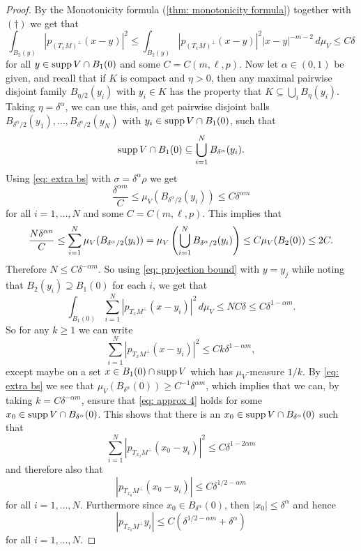 \begin{proof}
By the Monotonicity formula (\cref{thm: monotonicity formula}) together with $(\dagger)$ we get that
\begin{equation}
    \int_{B_2(y)} | p_{(T_xM)^{\perp}} (x - y) |^2 \le \int_{B_2(y)} |p_{(T_xM)^{\perp}} (x - y)|^2 |x-y|^{-m-2}\, d\mu_V \le C\delta \label{eq: projection bound}
\end{equation}
for all $y \in \operatorname{supp} V \cap B_1(0)$ and some $C=C(m,\ell,p)$. Now let $\alpha \in (0,1)$ be given, and recall that if $K$ is compact and $\eta > 0$, then any maximal pairwise disjoint family $B_{\eta/2}(y_i)$ with $y_i \in K$ has the property that $K \subseteq \bigcup_i B_{\eta}(y_i)$. Taking $\eta = \delta^{\alpha}$, we can use this, and get pairwise disjoint balls $B_{\delta^{\alpha}/2}(y_1), \dots, B_{\delta^{\alpha}/2}(y_N)$ with $y_i \in \operatorname{supp} V \cap B_1(0)$, such that
\begin{equation}
    \operatorname{supp} V \cap B_1(0) \subseteq \bigcup_{i=1}^N B_{\delta^{\alpha}}(y_i).\label{eq: helpful subsets}
\end{equation}
Using \eqref{eq: extra bs} with $\sigma = \delta^{\alpha}\rho$ we get
\[
    \frac{\delta^{\alpha m}}{C} \le \mu_V(B_{\delta^{\alpha}/2}(y_i)) \le C \delta^{\alpha m}
\]
for all $i = 1, \dots, N$ and some $C=C(m, \ell, p)$. This implies that
\[
    \frac{N \delta^{\alpha n}}{C} \le \sum_{i=1}^N \mu_V(B_{\delta^{\alpha}/2} (y_i)) = \mu_V\left( \bigcup_{i=1}^N B_{\delta^{\alpha}/2 } (y_i)\right) \le C \mu_V(B_2(0)) \le 2C.
\]
Therefore $N \le C \delta^{-\alpha m}$. So using \eqref{eq: projection bound} with $y=y_j$ while noting that $B_2(y_i) \supseteq B_1(0)$ for each $i$, we get that
\[
    \int_{B_1(0)} \sum_{i=1}^{N} | p_{T_xM^{\perp}} (x-y_i)|^2 \, d\mu_V \le NC\delta \le C\delta^{1-\alpha m}.
\]
So for any $k \ge 1$ we can write
\begin{equation}
    \sum_{i=1}^N | p_{T_xM^{\perp}} (x-y_i)|^2 \le Ck\delta^{1-\alpha m},\label{eq: approx 4}
\end{equation}
except maybe on a set $x \in B_1(0) \cap \operatorname{supp} V$ which has $\mu_V$-measure $1/k$. By \eqref{eq: extra bs} we see that $\mu_V(B_{\delta^{\alpha}}(0)) \ge C^{-1}\delta^{\alpha m}$, which implies that we can, by taking $k = C\delta^{-\alpha m}$, ensure that \eqref{eq: approx 4} holds for some $x_0 \in \operatorname{supp} V \cap B_{\delta^{\alpha}}(0)$. This shows that there is an $x_0 \in \operatorname{supp} V \cap B_{\delta^{\alpha}}(0)$ such that
\[
    \sum_{i=1}^N | p_{T_{x_0}M^{\perp}} (x_0-y_i)|^2 \le C\delta^{1-2\alpha m}
\]
and therefore also that
\[
    | p_{T_{x_0}M^{\perp}} (x_0-y_i)| \le C\delta^{1/2-\alpha m}
\]
for all $i =1, \dots, N$. Furthermore since $x_0 \in B_{\delta^{\alpha}}(0)$, then $|x_0| \le \delta^{\alpha}$ and hence
\[
    | p_{T_{x_0}M^{\perp}} y_i| \le C(\delta^{1/2-\alpha m} + \delta^{\alpha} )
\]
for all $i =1, \dots, N$.


\end{proof}

